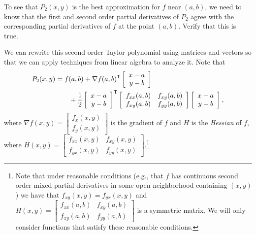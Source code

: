 \begin{pactivity} To see that $P_2(x,y)$ is the best approximation for $f$ near $(a,b)$, we need to know that the first and second order partial derivatives of $P_2$ agree with the corresponding partial derivatives of $f$ at the point $(a,b)$.  Verify that this is true.


\end{pactivity}



We can rewrite this second order Taylor polynomial using matrices and vectors so that we can apply techniques from linear algebra to analyze it. Note that 
\begin{align}
P_2(x,y) &= f(a,b) + \nabla f(a,b)^{\mathsf{T}} \left[ \begin{array}{c} x-a\\y-b \end{array} \right] \notag \\
			&\qquad + \frac{1}{2}\left[ \begin{array}{c} x-a\\y-b \end{array} \right]^{\mathsf{T}} \left[ \begin{array}{cc} f_{xx}(a,b)&f_{xy}(a,b) \\ f_{xy}(a,b)& f_{yy}(a,b) \end{array} \right] \left[ \begin{array}{c} x-a\\y-b \end{array} \right],  \label{eq:Taylor_2_vector}
\end{align}
where $\nabla f(x,y) = \left[ \begin{array}{c} f_x(x,y)\\f_y(x,y) \end{array} \right]$ is the gradient of $f$ and $H$ is the \emph{Hessian} of $f$, where $H(x,y) = \left[ \begin{array}{cc} f_{xx}(x,y)&f_{xy}(x,y) \\ f_{yx}(x,y)& f_{yy}(x,y) \end{array} \right]$.\footnote{Note that under reasonable conditions (e.g., that $f$ has continuous second order mixed partial derivatives in some open neighborhood containing $(x,y)$) we have that $f_{xy}(x,y) = f_{yx}(x,y)$ and $H(x,y) = \left[ \begin{array}{cc} f_{xx}(a,b)&f_{xy}(a,b) \\ f_{xy}(a,b)& f_{yy}(a,b) \end{array} \right]$ is a symmetric matrix. We will only consider functions that satisfy these reasonable conditions.}



